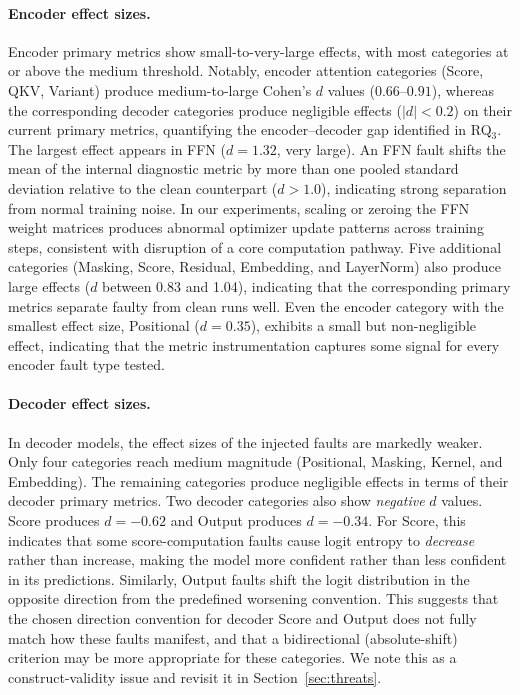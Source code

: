 \paragraph{Encoder effect sizes.}
Encoder primary metrics show small-to-very-large effects, with most categories at or above the medium threshold. Notably, encoder attention categories (Score, QKV, Variant) produce medium-to-large Cohen's $d$ values ($0.66$--$0.91$), whereas the corresponding decoder categories produce negligible effects ($|d| < 0.2$) on their current primary metrics, quantifying the encoder--decoder gap identified in RQ$_3$. The largest effect appears in FFN ($d = 1.32$, very large). An FFN fault shifts the mean of the internal diagnostic metric by more than one pooled standard deviation relative to the clean counterpart ($d > 1.0$), indicating strong separation from normal training noise. In our experiments, scaling or zeroing the FFN weight matrices produces abnormal optimizer update patterns across training steps, consistent with disruption of a core computation pathway. Five additional categories (Masking, Score, Residual, Embedding, and LayerNorm) also produce large effects ($d$ between 0.83 and 1.04), indicating that the corresponding primary metrics separate faulty from clean runs well. Even the encoder category with the smallest effect size, Positional ($d = 0.35$), exhibits a small but non-negligible effect, indicating that the metric instrumentation captures some signal for every encoder fault type tested.

\paragraph{Decoder effect sizes.}
In decoder models, the effect sizes of the injected faults are markedly weaker. Only four categories reach medium magnitude (Positional, Masking, Kernel, and Embedding). The remaining categories produce negligible effects in terms of their decoder primary metrics. Two decoder categories also show \emph{negative} $d$ values. Score produces $d = -0.62$ and Output produces $d = -0.34$. For Score, this indicates that some score-computation faults cause logit entropy to \emph{decrease} rather than increase, making the model more confident rather than less confident in its predictions. Similarly, Output faults shift the logit distribution in the opposite direction from the predefined worsening convention. This suggests that the chosen direction convention for decoder Score and Output does not fully match how these faults manifest, and that a bidirectional (absolute-shift) criterion may be more appropriate for these categories. We note this as a construct-validity issue and revisit it in Section~\ref{sec:threats}.

